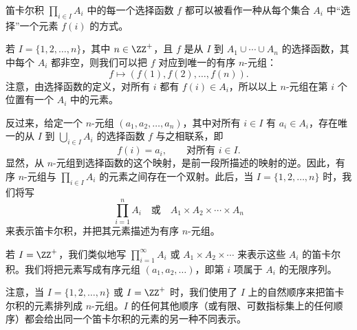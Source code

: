 笛卡尔积 $\prod_{i\in I}A_i$ 中的每一个选择函数 $f$ 都可以被看作一种从每个集合 $A_i$ 中“选择”一个元素 $f(i)$ 的方式。

若 $I=\{1,2,\ldots,n\}$，其中 $n\in\ZZ^+$，且 $f$ 是从 $I$ 到 $A_1\cup\cdots\cup A_n$ 的选择函数，其中每个 $A_i$ 都非空，则我们可以把 $f$ 对应到唯一的有序 $n$-元组：
\[
  f\longmapsto (f(1),f(2),\ldots,f(n)).
\]
注意，由选择函数的定义，对所有 $i$ 都有 $f(i)\in A_i$，所以以上 $n$-元组在第 $i$ 个位置有一个 $A_i$ 中的元素。

反过来，给定一个 $n$-元组 $(a_1,a_2,\ldots,a_n)$，其中对所有 $i\in I$ 有 $a_i\in A_i$，存在唯一的从 $I$ 到 $\bigcup_{i\in I}A_i$ 的选择函数 $f$ 与之相联系，即
\[
  f(i)=a_i,\qquad \text{对所有 } i\in I.
\]
显然，从 $n$-元组到选择函数的这个映射，是前一段所描述的映射的逆。因此，有序 $n$-元组与 $\prod_{i\in I}A_i$ 的元素之间存在一个双射。此后，当 $I=\{1,2,\ldots,n\}$ 时，我们将写
\[
  \prod_{i=1}^n A_i\quad\text{或}\quad A_1\times A_2\times\cdots\times A_n
\]
来表示笛卡尔积，并把其元素描述为有序 $n$-元组。

若 $I=\ZZ^+$，我们类似地写 $\prod_{i=1}^{\infty}A_i$ 或 $A_1\times A_2\times\cdots$ 来表示这些 $A_i$ 的笛卡尔积。我们将把元素写成有序元组 $(a_1,a_2,\ldots)$，即第 $i$ 项属于 $A_i$ 的无限序列。

注意，当 $I=\{1,2,\ldots,n\}$ 或 $I=\ZZ^+$ 时，我们使用了 $I$ 上的自然顺序来把笛卡尔积的元素排列成 $n$-元组。$I$ 的任何其他顺序（或有限、可数指标集上的任何顺序）都会给出同一个笛卡尔积的元素的另一种不同表示。

